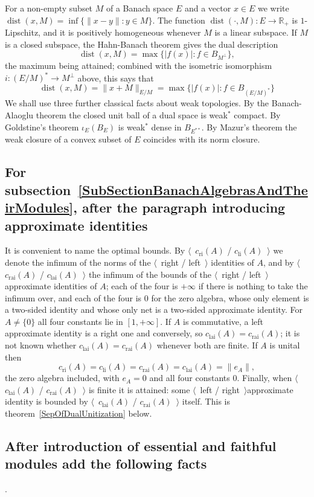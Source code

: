 \documentclass[11pt]{article}
\theoremstyle{plain}
\theoremstyle{definition}
\DeclareMathOperator{\dist}{dist}
\newcommand{\cri}{c_{\mathrm{ri}}}
\newcommand{\cli}{c_{\mathrm{li}}}
\newcommand{\crai}{c_{\mathrm{rai}}}
\newcommand{\clai}{c_{\mathrm{lai}}}
\begin{document}
For a non-empty subset $M$ of a Banach space $E$ and a vector $x\in E$ we write
$\dist(x,M)=\inf \{\lVert x-y\rVert:y\in M \}$. The function
$\dist(\cdot,M):E\to\mathbb{R}_+$ is $1$-Lipschitz, and it is positively
homogeneous whenever $M$ is a linear subspace. If $M$ is a closed subspace, the
Hahn-Banach theorem gives the dual description
\[
\dist(x,M)=\max \{|f(x)|:f\in B_{M^\perp} \},
\]
the maximum being attained; combined with the isometric isomorphism
$i:(E/M)^* \to M^\perp$ above, this says that
\[
\dist(x,M)=\lVert x+M\rVert_{E/M}=\max \{ |f(x)| : f\in B_{{(E/M)}^*} \}
\]
We shall use three further classical facts about weak topologies. By the 
Banach-Alaoglu theorem the closed unit ball of a dual space is weak${}^*$ 
compact. By Goldstine's theorem
$\iota_E(B_E)$ is weak${}^*$ dense in $B_{E^{**}}$. By Mazur's theorem the weak
closure of a convex subset of $E$ coincides with its norm closure.

\subsection{For subsection~\ref{SubSectionBanachAlgebrasAndTheirModules}, after
the paragraph introducing approximate identities}

It is convenient to name the optimal bounds. By
$\langle$~$\cri(A)$ / $\cli(A)$~$\rangle$ we denote the infimum of the norms of
the $\langle$~right / left~$\rangle$ identities of $A$, and by
$\langle$~$\crai(A)$ / $\clai(A)$~$\rangle$ the infimum of the bounds of the
$\langle$~right / left~$\rangle$ approximate identities of $A$; each of the four
is $+\infty$ if there is nothing to take the infimum over, and each of the four
is $0$ for the zero algebra, whose only element is a two-sided identity and
whose only net is a two-sided approximate identity. For $A\neq \{0 \}$ all four
constants lie in $[1,+\infty]$. If $A$ is commutative, a left
approximate identity is a right one and conversely, so $\clai(A)=\crai(A)$; it is
not known whether $\clai(A)=\crai(A)$ whenever both are finite. If $A$ is unital
then
\[
\cri(A)=\cli(A)=\crai(A)=\clai(A)=\lVert e_A\rVert ,
\]
the zero algebra included, with $e_A=0$ and all four constants $0$. Finally, 
when $\langle$~$\clai(A)$ / $\crai(A)$~$\rangle$ is finite it is attained: some 
 $\langle$~left / right~$\rangle$approximate identity is 
bounded by $\langle$~$\clai(A)$ / $\crai(A)$~$\rangle$ itself. This is 
theorem~\ref{SepOfDualUnitization} below.

\subsection{After introduction of essential and faithful modules add the 
following facts}.
\end{document}
